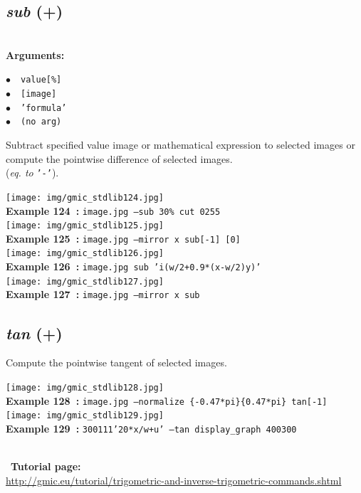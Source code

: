 \documentclass[a4paper,10.5pt,twoside]{book}
\def\comma{\discretionary{,}{}{,}}
\newcommand{\Cb}[1]{\textcolor{cb}{#1}}
\begin{document}
\subsection{\emph{sub} (+)}\vspace*{-0.7em}
~\\\textbf{\Cb{Arguments: }}\begin{flushleft}
{\small \Cb{\hspace*{0.5cm}$\bullet$~~\texttt{value[\%]}}}~~~\\
{\small \Cb{\hspace*{0.5cm}$\bullet$~~\texttt{[image]}}}~~~\\
{\small \Cb{\hspace*{0.5cm}$\bullet$~~\texttt{'formula'}}}~~~\\
{\small \Cb{\hspace*{0.5cm}$\bullet$~~\texttt{(no arg)}}}\end{flushleft}
Subtract specified value{\comma} image or mathematical expression to selected images{\comma}
or compute the pointwise difference of selected images.
~\\(\emph{eq. to} {\small \texttt{'-'}}).
\begin{center}\texttt{[image: img/gmic\_stdlib124.jpg]}\\
{\footnotesize \textbf{Example 124~:} \texttt{image.jpg --sub 30\% cut 0{\comma}255}}
\\\texttt{[image: img/gmic\_stdlib125.jpg]}\\
{\footnotesize \textbf{Example 125~:} \texttt{image.jpg --mirror x sub[-1] [0]}}
\\\texttt{[image: img/gmic\_stdlib126.jpg]}\\
{\footnotesize \textbf{Example 126~:} \texttt{image.jpg sub 'i(w/2+0.9*(x-w/2){\comma}y)'}}
\\\texttt{[image: img/gmic\_stdlib127.jpg]}\\
{\footnotesize \textbf{Example 127~:} \texttt{image.jpg --mirror x sub}}
\end{center}

\subsection{\emph{tan} (+)}\vspace*{-0.7em}
Compute the pointwise tangent of selected images.
\begin{center}\texttt{[image: img/gmic\_stdlib128.jpg]}\\
{\footnotesize \textbf{Example 128~:} \texttt{image.jpg --normalize \{-0.47*pi\}{\comma}\{0.47*pi\} tan[-1]}}
\\\texttt{[image: img/gmic\_stdlib129.jpg]}\\
{\footnotesize \textbf{Example 129~:} \texttt{300{\comma}1{\comma}1{\comma}1{\comma}'20*x/w+u' --tan display\_graph 400{\comma}300}}
\end{center}
~\\
~\textbf{Tutorial page: }\\\url{http://gmic.eu/tutorial/trigometric-and-inverse-trigometric-commands.shtml}
\end{document}
